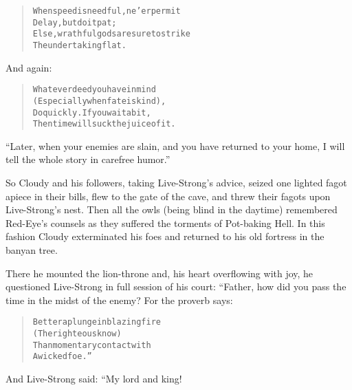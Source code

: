 \documentclass[article, twoside, 14pt]{memoir}
\renewenvironment{verbatim}{%
\begin{quote}%
\vskip -10pt%
\begin{alltt}\normalfont\large}{\end{alltt}%
\end{quote}%
\vskip -10pt
} %
\begin{document}
\begin{verbatim}
When speed is needful, ne'er permit
    Delay, but do it pat;
Else, wrathful gods are sure to strike
    The undertaking flat.
\end{verbatim}
And again:

\begin{verbatim}
Whatever deed you have in mind
(Especially when fate is kind),
Do quickly. If you wait a bit,
Then time will suck the juice of it.
\end{verbatim}
``Later, when your enemies are slain, and you have returned to your home, I will tell the whole story in carefree humor.''

So Cloudy and his followers, taking Live-Strong's advice,
seized one lighted fagot apiece in their bills, flew to the gate of
the cave, and threw their fagots upon Live-Strong's nest. Then all
the owls (being blind in the daytime) remembered Red-Eye's counsels
as they suffered the torments of Pot-baking Hell. In this fashion
Cloudy exterminated his foes and returned to his old fortress in
the banyan tree.

There he mounted the lion-throne and, his heart overflowing with
joy, he questioned Live-Strong in full session of his court:
“Father, how did you pass the time in the midst of the enemy? For
the proverb says:

\begin{verbatim}
Better a plunge in blazing fire
    (The righteous know)
Than momentary contact with
    A wicked foe.”
\end{verbatim}
And Live-Strong said: “My lord and king!
\end{document}
